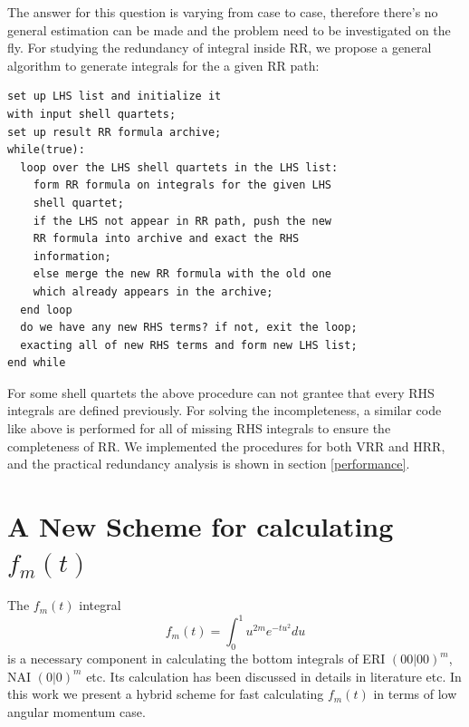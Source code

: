The answer for this question is varying from case to case, therefore there's 
no general estimation can be made and the problem need to be investigated 
on the fly. For studying the redundancy of integral inside RR, we propose
a general algorithm to generate integrals for the a given RR path:
\begin{verbatim}
set up LHS list and initialize it
with input shell quartets;
set up result RR formula archive;
while(true):
  loop over the LHS shell quartets in the LHS list:
    form RR formula on integrals for the given LHS 
    shell quartet;
    if the LHS not appear in RR path, push the new 
    RR formula into archive and exact the RHS 
    information;
    else merge the new RR formula with the old one
    which already appears in the archive;
  end loop
  do we have any new RHS terms? if not, exit the loop;
  exacting all of new RHS terms and form new LHS list;
end while
\end{verbatim}
For some shell quartets the above procedure can not grantee that every
RHS integrals are defined previously. For solving the incompleteness,
a similar code like above is performed for all of missing RHS integrals
to ensure the completeness of RR. We implemented the procedures for 
both VRR and HRR, and the practical redundancy
analysis is shown in section \ref{performance}.
 
\section{A New Scheme for calculating $f_{m}(t)$}
\label{fmt}

The $f_{m}(t)$ integral
\begin{equation}\label{fm_ssssm_fmt_eq:1}
 f_{m}(t) = \int^{1}_{0} u^{2m} e^{-tu^{2}} du 
\end{equation}
is a necessary component in calculating the bottom integrals of ERI $(00|00)^{m}$,
NAI $(0|0)^{m}$ etc. Its calculation has been discussed in details in literature
\cite{harris1983sssm, gill1991two} etc. In this work we present a hybrid scheme 
for fast calculating $f_{m}(t)$ in terms of low angular momentum case.

